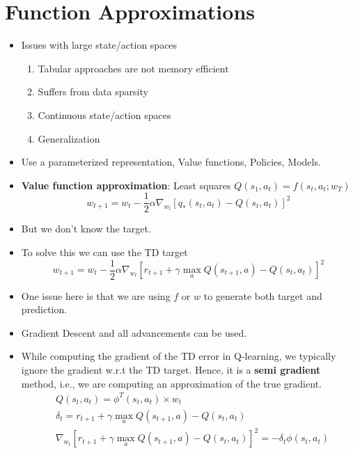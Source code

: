\documentclass[a4paper]{article}
\begin{document}
\section{Function Approximations}
\begin{itemize}
    \item Issues with large state/action spaces
    \begin{enumerate}
        \item Tabular approaches are not memory efficient
        \item Suffers from data sparsity
        \item Continuous state/action spaces
        \item Generalization
    \end{enumerate}
    \item Use a parameterized representation, Value functions, Policies, Models.
    \item \textbf{Value function approximation}: Least squares $Q(s_1,a_t)=f(s_t,a_t;w_T)$
    \begin{equation*}
        w_{t+1}=w_t-\frac{1}{2}\alpha \nabla_{w_t}[q_*(s_t,a_t)-Q(s_t,a_t)]^2
    \end{equation*}
    \item But we don't know the target.
    \item To solve this we can use the TD target
    \begin{equation*}
        w_{t+1}=w_t-\frac{1}{2}\alpha \nabla_{w_t}[r_{t+1}+\gamma \max_aQ(s_{t+1},a)-Q(s_t,a_t)]^2
    \end{equation*}
    \item One issue here is that we are using $f$ or $w$ to generate both target and prediction.
    \item Gradient Descent and all advancements can be used.
    \item While computing the gradient of the TD error in Q-learning, we typically ignore the gradient w.r.t the TD target. Hence, it is a \textbf{semi gradient} method, i.e., we are computing an approximation of the true gradient.
    \begin{equation*}
        \begin{split}
            &Q(s_t,a_t)=\phi^T(s_t,a_t)\times w_t\\
            &\delta_t=r_{t+1}+\gamma \max_aQ(s_{t+1},a)-Q(s_t,a_t)\\
            &\nabla_{w_t}[r_{t+1}+\gamma \max_aQ(s_{t+1},a)-Q(s_t,a_t)]^2=-\delta_t\phi(s_t,a_t)\\

\end{split}
\end{equation*}
\end{itemize}
\end{document}
